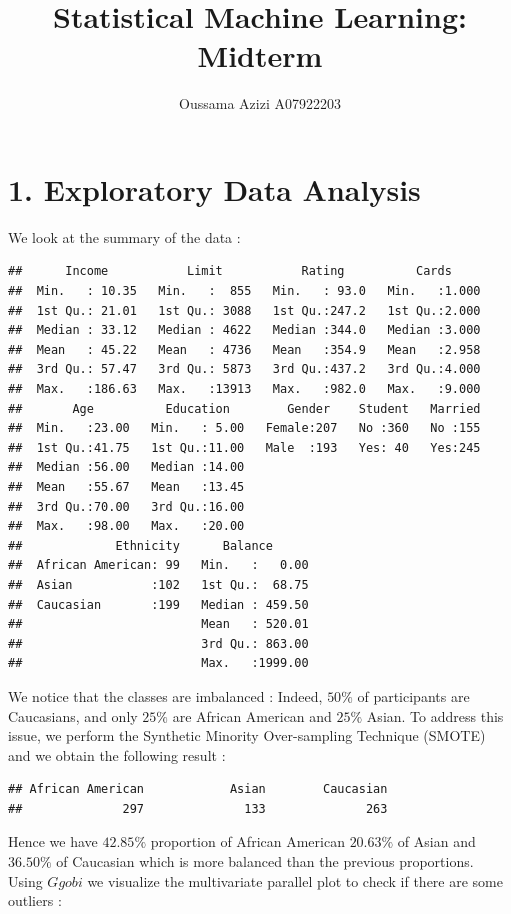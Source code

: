 \documentclass[]{article}
\title{Statistical Machine Learning: Midterm}
\author{Oussama Azizi A07922203}
\date{}
\begin{document}
\maketitle

\section{1. Exploratory Data Analysis}\label{exploratory-data-analysis}

We look at the summary of the data :

\begin{verbatim}
##      Income           Limit           Rating          Cards      
##  Min.   : 10.35   Min.   :  855   Min.   : 93.0   Min.   :1.000  
##  1st Qu.: 21.01   1st Qu.: 3088   1st Qu.:247.2   1st Qu.:2.000  
##  Median : 33.12   Median : 4622   Median :344.0   Median :3.000  
##  Mean   : 45.22   Mean   : 4736   Mean   :354.9   Mean   :2.958  
##  3rd Qu.: 57.47   3rd Qu.: 5873   3rd Qu.:437.2   3rd Qu.:4.000  
##  Max.   :186.63   Max.   :13913   Max.   :982.0   Max.   :9.000  
##       Age          Education        Gender    Student   Married  
##  Min.   :23.00   Min.   : 5.00   Female:207   No :360   No :155  
##  1st Qu.:41.75   1st Qu.:11.00   Male  :193   Yes: 40   Yes:245  
##  Median :56.00   Median :14.00                                   
##  Mean   :55.67   Mean   :13.45                                   
##  3rd Qu.:70.00   3rd Qu.:16.00                                   
##  Max.   :98.00   Max.   :20.00                                   
##             Ethnicity      Balance       
##  African American: 99   Min.   :   0.00  
##  Asian           :102   1st Qu.:  68.75  
##  Caucasian       :199   Median : 459.50  
##                         Mean   : 520.01  
##                         3rd Qu.: 863.00  
##                         Max.   :1999.00
\end{verbatim}

We notice that the classes are imbalanced : Indeed, \(50\%\) of
participants are Caucasians, and only \(25\%\) are African American and
\(25\%\) Asian. To address this issue, we perform the Synthetic Minority
Over-sampling Technique (SMOTE) and we obtain the following result :

\begin{verbatim}
## African American            Asian        Caucasian 
##              297              133              263
\end{verbatim}

Hence we have \(42.85\%\) proportion of African American \(20.63\%\) of
Asian and \(36.50\%\) of Caucasian which is more balanced than the
previous proportions. Using \(Ggobi\) we visualize the multivariate
parallel plot to check if there are some outliers :
\end{document}
